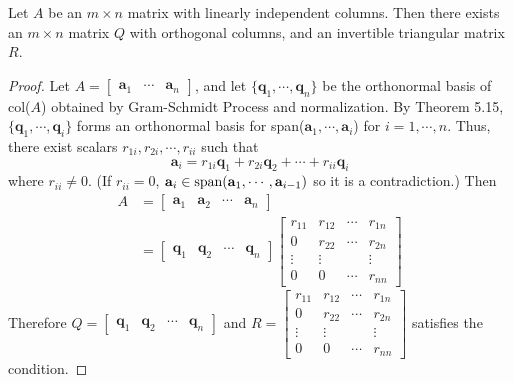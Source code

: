 \begin{theorem}
	Let $A$ be an $m \times n$ matrix with linearly independent columns. Then there exists an $m \times n$ matrix $Q$ with orthogonal columns, and an invertible triangular matrix $R$.
\end{theorem}
\begin{proof}
	Let $A = \begin{bmatrix}
		\textbf{a}_1 & \cdots & \textbf{a}_n
	\end{bmatrix}$, and let $\{\textbf{q}_1, \cdots, \textbf{q}_n \}$ be the orthonormal basis of col($A$) obtained by Gram-Schmidt Process and normalization. By Theorem 5.15, $\{\textbf{q}_1, \cdots, \textbf{q}_i \}$ forms an orthonormal basis for span($\textbf{a}_1, \cdots, \textbf{a}_i$) for $i = 1, \cdots, n$. Thus, there exist scalars $r_{1i}, r_{2i}, \cdots, r_{ii}$ such that \begin{equation*}
		\textbf{a}_i = r_{1i}\textbf{q}_1 + r_{2i}\textbf{q}_2 + \cdots + r_{ii}\textbf{q}_i
	\end{equation*} where $r_{ii} \neq 0$. (If $r_{ii} = 0$, $\textbf{a}_i \in \textnormal{span}(\textbf{a}_1, \cdots, \textbf{a}_{i-1})$ so it is a contradiction.) Then \begin{align*}
		A &= \begin{bmatrix}
			\textbf{a}_1 & \textbf{a}_2 & \cdots & \textbf{a}_n
		\end{bmatrix} \\
		&= \begin{bmatrix}
			\textbf{q}_1 & \textbf{q}_2 & \cdots & \textbf{q}_n
		\end{bmatrix} \begin{bmatrix}
			r_{11} & r_{12} & \cdots & r_{1n} \\
			0      & r_{22} & \cdots & r_{2n} \\
			\vdots & \vdots &        & \vdots \\
			0      & 0      & \cdots & r_{nn}
		\end{bmatrix}
	\end{align*}
	Therefore $Q = \begin{bmatrix}
		\textbf{q}_1 & \textbf{q}_2 & \cdots & \textbf{q}_n
	\end{bmatrix}$ and $R = \begin{bmatrix}
	r_{11} & r_{12} & \cdots & r_{1n} \\
	0      & r_{22} & \cdots & r_{2n} \\
	\vdots & \vdots &        & \vdots \\
	0      & 0      & \cdots & r_{nn}
	\end{bmatrix}$ satisfies the condition.
\end{proof}

